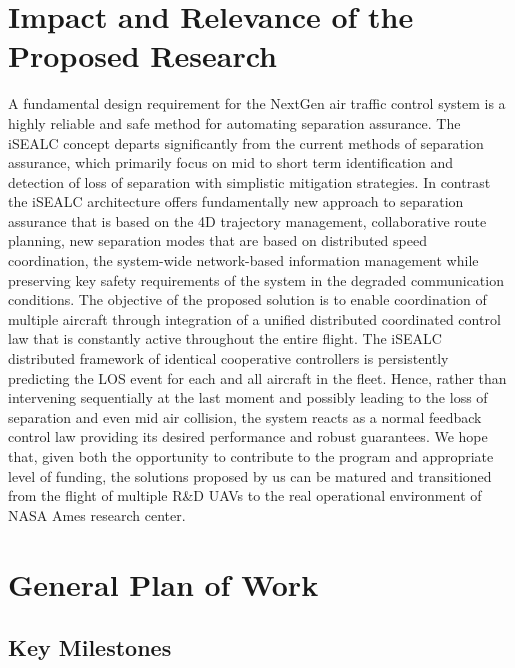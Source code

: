 \documentclass[letter,onecolumn,12pt]{aiaa-tc}
\newcommand{\1}{1_n}
\begin{document}
\section{Impact and Relevance of the Proposed Research}
A fundamental design requirement for the NextGen air traffic control system is a highly reliable and safe method for automating separation assurance. The iSEALC concept departs significantly from the current methods of separation assurance, which primarily focus on mid to short term identification and detection of loss of separation with simplistic mitigation strategies. In contrast the iSEALC architecture offers fundamentally new approach to separation assurance that is based on the 4D trajectory management, collaborative route planning, new separation modes that are based on distributed speed coordination, the system-wide network-based information management while preserving key safety requirements of the system in the degraded communication conditions. The objective of the proposed solution is to enable coordination of multiple aircraft through integration of a unified distributed coordinated control law that is constantly active throughout the entire flight. The iSEALC distributed framework of identical cooperative controllers is persistently predicting the LOS event for each and all aircraft in the fleet. Hence, rather than intervening sequentially at the last moment and possibly leading to the loss of separation and even mid air collision, the system reacts as a normal feedback control law providing its desired performance and robust guarantees. We hope that, given both the opportunity to contribute to the program and appropriate level of funding, the solutions proposed by us can be matured and transitioned from the flight of multiple R\&D UAVs to the real operational environment of NASA Ames research center.


\section{General Plan of Work}

\subsection{Key Milestones}
\end{document}
